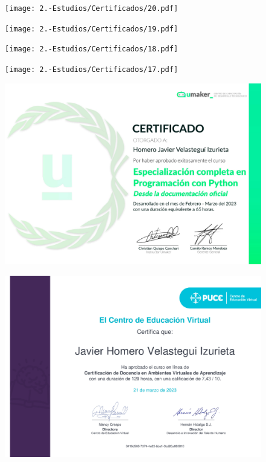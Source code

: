 \begin{figure}[ht]
    \setlength{\parindent}{-20pt}
    \texttt{[image: 2.-Estudios/Certificados/20.pdf]}
\end{figure}

\begin{figure}[ht]
    \setlength{\parindent}{-20pt}
    \texttt{[image: 2.-Estudios/Certificados/19.pdf]}
\end{figure}

\begin{figure}[ht]
    \setlength{\parindent}{-20pt}
    \texttt{[image: 2.-Estudios/Certificados/18.pdf]}
\end{figure}

\begin{figure}[ht]
    \setlength{\parindent}{-20pt}
    \texttt{[image: 2.-Estudios/Certificados/17.pdf]}
\end{figure}

\begin{figure}[ht]
    \setlength{\parindent}{-20pt}
    \includegraphics[width=\textwidth]{2.-Estudios/Certificados/16.pdf}
\end{figure}

\begin{figure}[ht]
    \setlength{\parindent}{-20pt}
    \includegraphics[width=\textwidth]{2.-Estudios/Certificados/14.pdf}
\end{figure}

